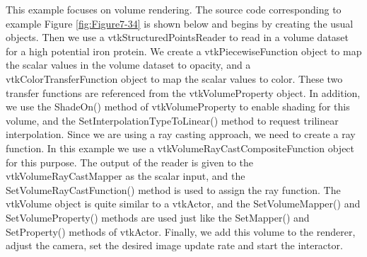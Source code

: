 This example focuses on volume rendering. The source code corresponding to example Figure \ref{fig:Figure7-34} is shown below and begins by creating the usual objects. Then we use a vtkStructuredPointsReader to read in a volume dataset for a high potential iron protein. We create a vtkPiecewiseFunction object to map the scalar values in the volume dataset to opacity, and a vtkColorTransferFunction object to map the scalar values to color. These two transfer functions are referenced from the vtkVolumeProperty object. In addition, we use the ShadeOn() method of vtkVolumeProperty to enable shading for this volume, and the SetInterpolationTypeToLinear() method to request trilinear interpolation. Since we are using a ray casting approach, we need to create a ray function. In this example we use a vtkVolumeRayCastCompositeFunction object for this purpose. The output of the reader is given to the vtkVolumeRayCastMapper as the scalar input, and the SetVolumeRayCastFunction() method is used to assign the ray function. The vtkVolume object is quite similar to a vtkActor, and the SetVolumeMapper() and SetVolumeProperty() methods are used just like the SetMapper() and SetProperty() methods of vtkActor. Finally, we add this volume to the renderer, adjust the camera, set the desired image update rate and start the interactor.

